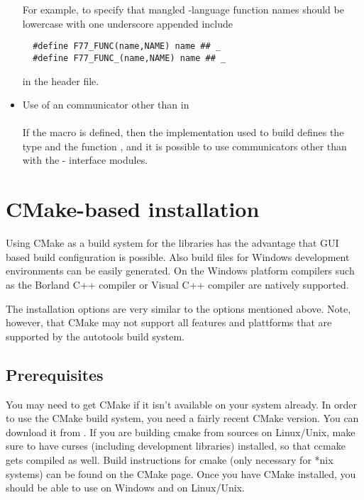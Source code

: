 \begin{itemize}
  For example, to specify that mangled {\C}-language function names
  should be lowercase with one underscore appended include
\begin{verbatim}
  #define F77_FUNC(name,NAME) name ## _
  #define F77_FUNC_(name,NAME) name ## _
\end{verbatim}
  in the  header file.

\item Use of an {\mpi} communicator other than  in {\F}\\ \\
  If the macro  is defined, then the
  {\mpi} implementation used to build {\sundials} defines the type
   and the function , and it is
  possible to use {\mpi} communicators other than
   with the {\F}-{\C} interface modules.
\end{itemize}






















\section{CMake-based installation}



Using CMake as a build system for the {\sundials} libraries has the advantage that GUI
based build configuration is possible. Also build files for Windows development environments 
can be easily generated. On the Windows platform compilers such as the Borland C++ compiler 
or Visual C++ compiler are natively supported. 

The installation options are very similar to the options mentioned above. Note, however, 
that CMake may not support all features and plattforms that are supported by the autotools build system.

\subsection{Prerequisites}
You may need to get CMake if it isn't available on your system already. In order to use the CMake build system,
you need a fairly recent CMake version. You can download it from . 
If you are building cmake from sources on Linux/Unix, make sure to have curses (including development libraries)
installed, so that ccmake gets compiled as well. Build instructions for cmake (only necessary for *nix systems) 
can be found on the CMake page. Once you have CMake installed, you should be able to use  
on Windows and  on Linux/Unix. 

